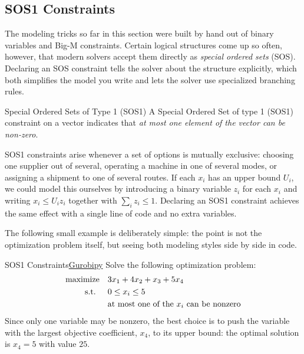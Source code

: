\subsection{SOS1 Constraints}
The modeling tricks so far in this section were built by hand out of binary variables and Big-M constraints.  Certain logical structures come up so often, however, that modern solvers accept them directly as \emph{special ordered sets} (SOS).  Declaring an SOS constraint tells the solver about the structure explicitly, which both simplifies the model you write and lets the solver use specialized branching rules.
\begin{definition}{Special Ordered Sets of Type 1 (SOS1)}
A Special Ordered Set of type 1 (SOS1) constraint on a vector indicates that \emph{at most one element of the vector can be non-zero}.
\end{definition}
SOS1 constraints arise whenever a set of options is mutually exclusive: choosing one supplier out of several, operating a machine in one of several modes, or assigning a shipment to one of several routes.  If each $x_i$ has an upper bound $U_i$, we could model this ourselves by introducing a binary variable $z_i$ for each $x_i$ and writing $x_i \leq U_i z_i$ together with $\sum_i z_i \leq 1$.  Declaring an SOS1 constraint achieves the same effect with a single line of code and no extra variables.

The following small example is deliberately simple: the point is not the optimization problem itself, but seeing both modeling styles side by side in code.

\begin{examplewithcode}{SOS1 Constraints}{\href{https://github.com/open-optimization/open-optimization-or-examples/blob/master/nonlinear-programming/Gurobi-SOS-Examples.ipynb}{Gurobipy}}
\label{example:sos1}
Solve the following optimization problem: \[\begin{aligned}
\text{maximize}\quad & 3x_1 + 4x_2 + x_3 + 5x_4 \\
\text{ s.t. } \quad & 0 \le x_i \le 5 \\
& \text{at most one of the $x_i$ can be nonzero}
\end{aligned}\]
Since only one variable may be nonzero, the best choice is to push the variable with the largest objective coefficient, $x_4$, to its upper bound: the optimal solution is $x_4 = 5$ with value $25$.
\end{examplewithcode}
